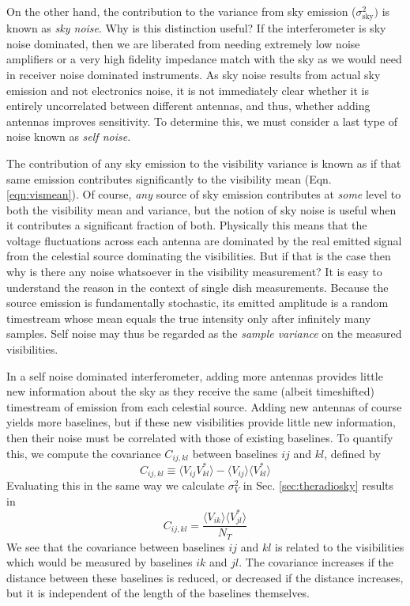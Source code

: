 On the other hand, the contribution to the variance from sky emission ($\sigma_\text{sky}^2)$ is known as \textit{sky noise}. Why is this distinction useful? If the interferometer is sky noise dominated, then we are liberated from needing extremely low noise amplifiers or a very high fidelity impedance match with the sky as we would need in receiver noise dominated instruments. As sky noise results from actual sky emission and not electronics noise, it is not immediately clear whether it is entirely uncorrelated between different antennas, and thus, whether adding antennas improves sensitivity. To determine this, we must consider a last type of noise known as \textit{self noise}. 

The contribution of any sky emission to the visibility variance is known as  if that same emission contributes significantly to the visibility mean (Eqn. \ref{eqn:vismean}). Of course, \textit{any} source of sky emission contributes at \textit{some} level to both the visibility mean and variance, but the notion of sky noise is useful when it contributes a significant fraction of both. Physically this means that the voltage fluctuations across each antenna are dominated by the real emitted signal from the celestial source dominating the visibilities. But if that is the case then why is there any noise whatsoever in the visibility measurement? It is easy to understand the reason in the context of single dish measurements. Because the source emission is fundamentally stochastic, its emitted amplitude is a random timestream whose mean equals the true intensity only after infinitely many samples. Self noise may thus be regarded as the \textit{sample variance} on the measured visibilities. 

In a self noise dominated interferometer, adding more antennas provides little new information about the sky as they receive the same (albeit timeshifted) timestream of emission from each celestial source. Adding new antennas of course yields more baselines, but if these new visibilities provide little new information, then their noise must be correlated with those of existing baselines. To quantify this, we compute the covariance $C_{ij,kl}$ between baselines $ij$ and $kl$, defined by
\begin{equation}
C_{ij,kl}\equiv\langle V_{ij}V_{kl}^*\rangle-\langle V_{ij}\rangle\langle V_{kl}^*\rangle
\end{equation}
Evaluating this in the same way we calculate $\sigma_V^2$ in Sec. \ref{sec:theradiosky} results in
\begin{equation}
\label{eqn:covfinal}
C_{ij,kl}=\frac{\langle V_{ik}\rangle\langle V_{jl}^*\rangle}{N_T}
\end{equation}
We see that the covariance between baselines $ij$ and $kl$ is related to the visibilities which would be measured by baselines $ik$ and $jl$. The covariance increases if the distance between these baselines is reduced, or decreased if the distance increases, but it is independent of the length of the baselines themselves.

